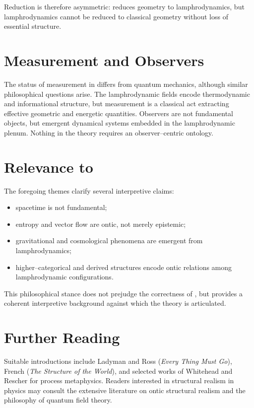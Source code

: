 Reduction is therefore asymmetric: \rsvpabbr{} reduces geometry to
lamphrodynamics, but lamphrodynamics cannot be reduced to classical
geometry without loss of essential structure.

\section{Measurement and Observers}

The status of measurement in \rsvpabbr{} differs from quantum
mechanics, although similar philosophical questions arise.  The
lamphrodynamic fields encode thermodynamic and informational structure,
but measurement is a classical act extracting effective geometric and
energetic quantities.  Observers are not fundamental objects, but
emergent dynamical systems embedded in the lamphrodynamic plenum.
Nothing in the theory requires an observer--centric ontology.

\section{Relevance to \rsvpabbr{}}

The foregoing themes clarify several interpretive claims:

\begin{itemize}
\item spacetime is not fundamental;
\item entropy and vector flow are ontic, not merely epistemic;
\item gravitational and cosmological phenomena are emergent from
lamphrodynamics;
\item higher--categorical and derived structures encode ontic relations
among lamphrodynamic configurations.
\end{itemize}

This philosophical stance does not prejudge the correctness of
\rsvpabbr{}, but provides a coherent interpretive background against
which the theory is articulated.

\section{Further Reading}

Suitable introductions include Ladyman and Ross (\emph{Every Thing Must
Go}), French (\emph{The Structure of the World}), and selected works of
Whitehead and Rescher for process metaphysics.  Readers interested in
structural realism in physics may consult the extensive literature on
ontic structural realism and the philosophy of quantum field theory.


